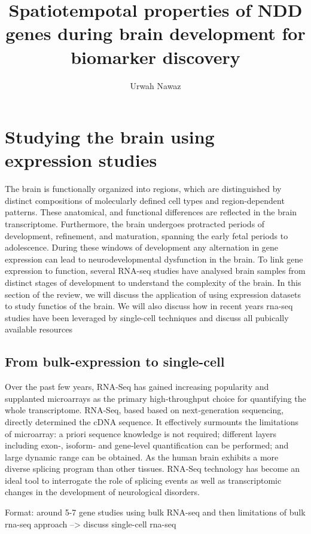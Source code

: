 \documentclass[12pt]{article}
\title{Spatiotempotal properties of NDD genes during brain development for biomarker discovery}
\author{Urwah Nawaz}
\begin{document}
	\maketitle

\section{Studying the brain using expression studies}
The brain is functionally organized into regions, which are distinguished by distinct compositions of molecularly defined cell types and region-dependent patterns. These anatomical, and functional differences are reflected in the brain transcriptome. 
Furthermore, the brain undergoes protracted periods of development, refinement, and maturation, spanning the early fetal periods to adolescence.
During these windows of development any alternation in gene expression can lead to neurodevelopmental dysfunction in the brain. 
To link gene expression to function, several RNA-seq studies have analysed brain samples from distinct stages of development to understand the complexity of the brain. In this section of the review, we will discuss the application of using expression datasets to study functios of the brain. 
We will also discuss how in recent years rna-seq studies have been leveraged by single-cell techniques and discuss all pubically available resources

\subsection{From bulk-expression to single-cell}
Over the past few years, RNA‐Seq has gained increasing popularity and supplanted microarrays as the primary high‐throughput choice for quantifying the whole transcriptome.
RNA‐Seq, based based on next‐generation sequencing, directly determined the cDNA sequence. It effectively surmounts the limitations of microarray: a priori sequence knowledge is not required; different layers including exon‐, isoform‐ and gene‐level quantification can be performed; and large dynamic range can be obtained. As the human brain exhibits a more diverse splicing program than other tissues.  RNA‐Seq technology has become an ideal tool to interrogate the role of splicing events as well as transcriptomic changes in the development of neurological disorders.



Format: around 5-7 gene studies using bulk RNA-seq and then limitations of bulk rna-seq approach --> discuss single-cell rna-seq
\end{document}

